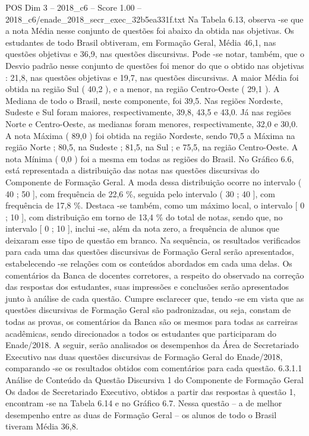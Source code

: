 \begin{textsample}{POS Dim 3 – 2018\_c6 – Score 1.00 – 2018\_c6/enade\_2018\_secr\_exec\_32b5ea331f.txt}
Na Tabela 6.13, observa -se que a nota Média nesse conjunto de questões foi abaixo da obtida nas objetivas.
Os estudantes de todo Brasil obtiveram, em Formação Geral, Média 46,1, nas questões objetivas e 36,9, nas questões discursivas.
Pode -se notar, também, que o Desvio padrão nesse conjunto de questões foi menor do que o obtido nas objetivas : 21,8, nas questões objetivas e 19,7, nas questões discursivas.
A maior Média foi obtida na região Sul ( 40,2 ), e a menor, na região Centro-Oeste ( 29,1 ).
A Mediana de todo o Brasil, neste componente, foi 39,5.
Nas regiões Nordeste, Sudeste e Sul foram maiores, respectivamente, 39,8, 43,5 e 43,0.
Já nas regiões Norte e Centro-Oeste, as medianas foram menores, respectivamente, 32,0 e 30,0.
A nota Máxima ( 89,0 ) foi obtida na região Nordeste, sendo 70,5 a Máxima na região Norte ; 80,5, na Sudeste ; 81,5, na Sul ; e 75,5, na região Centro-Oeste.
A nota Mínima ( 0,0 ) foi a mesma em todas as regiões do Brasil.
No Gráfico 6.6, está representada a distribuição das notas nas questões discursivas do Componente de Formação Geral.
A moda dessa distribuição ocorre no intervalo ( 40 ; 50 ], com frequência de 22,6 \%, seguida pelo intervalo ( 30 ; 40 ], com frequência de 17,8 \%.
Destaca -se também, como um máximo local, o intervalo [ 0 ; 10 ], com distribuição em torno de 13,4 \% do total de notas, sendo que, no intervalo [ 0 ; 10 ], inclui -se, além da nota zero, a frequência de alunos que deixaram esse tipo de questão em branco.
Na sequência, os resultados verificados para cada uma das questões discursivas de Formação Geral serão apresentados, estabelecendo -se relações com os conteúdos abordados em cada uma delas.
Os comentários da Banca de docentes corretores, a respeito do observado na correção das respostas dos estudantes, suas impressões e conclusões serão apresentados junto à análise de cada questão.
Cumpre esclarecer que, tendo -se em vista que as questões discursivas de Formação Geral são padronizadas, ou seja, constam de todas as provas, os comentários da Banca são os mesmos para todas as carreiras acadêmicas, sendo direcionados a todos os estudantes que participaram do Enade/2018.
A seguir, serão analisados os desempenhos da Área de Secretariado Executivo nas duas questões discursivas de Formação Geral do Enade/2018, comparando -se os resultados obtidos com comentários para cada questão. 6.3.1.1 Análise de Conteúdo da Questão Discursiva 1 do Componente de Formação Geral Os dados de Secretariado Executivo, obtidos a partir das respostas à questão 1, encontram -se na Tabela 6.14 e no Gráfico 6.7.
Nessa questão – a de melhor desempenho entre as duas de Formação Geral – os alunos de todo o Brasil tiveram Média 36,8.

\end{textsample}

